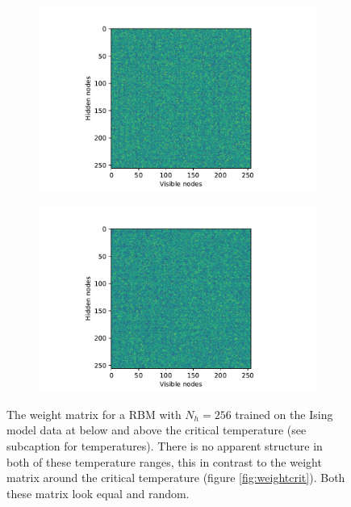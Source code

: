 \documentclass[10 pt, a4paper]{article}
\begin{document}
\begin{figure}[H] 
\begin{subfigure}[b]{0.5\textwidth}
  \centering
    \includegraphics[width=\textwidth]{weightsLow}
\end{subfigure}
\begin{subfigure}[b]{0.5\textwidth} 
  \centering
    \includegraphics[width=\textwidth]{weightsHigh}
\end{subfigure}
\caption{The weight matrix for a RBM with $N_h = 256$ trained on the Ising model data at below and above the critical temperature (see subcaption for temperatures). There is no apparent structure in both of these temperature ranges, this in contrast to the weight matrix around the critical temperature (figure \ref{fig:weightcrit}). Both these matrix look equal and random.}
  \label{fig:weightlowhigh}
\end{figure}
\end{document}
